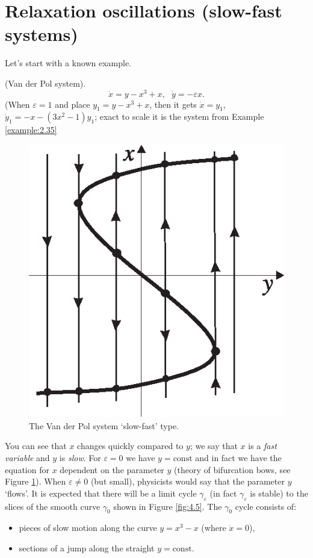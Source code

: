 \section{Relaxation oscillations (slow-fast systems)}
Let's start with a known example.
\begin{example}(Van der Pol system).
	$$
	\dot{x}=y-x^{3}+x,\text{ \ \ }\dot{y}=-\varepsilon x.
	$$
	(When $\varepsilon =1$ and place $y_{1}=y-x^{3}+x$, then it gets $\dot{x}=y_{1}$, $\dot{y}_{1}=-x-(3x^{2}-1)y_{1}$; exact to scale it is the system from Example \ref{example:2.35}
	\begin{figure}[!ht]
		\centering
		\includegraphics [scale=1.4]{jtr44}
		\caption{The Van der Pol system	`slow-fast' type.}
		\label{fig:4.4}
	\end{figure}
	
	You can see that $x$ changes quickly compared to $y$; we say that $x$ is a \emph{fast variable} and $y$ is \emph{slow}. For $\varepsilon =0$ we have $y = \textrm{const}$ and in fact we have the equation for $x$ dependent on the parameter $y$	(theory of bifurcation bows, see Figure \ref{fig:4.4}). When $\varepsilon \not=0$ (but small), physicists would say that the parameter $y$ `flows'. It is expected that there will be a limit cycle $\gamma _{\varepsilon }$ (in fact $\gamma _{\varepsilon }$ is stable) to the slices of the smooth curve $\gamma_0$ shown in Figure \ref{fig:4.5}. The $\gamma _0$ cycle consists of:
	\begin{itemize}
		\item pieces of slow motion along the curve $y=x^{3}-x$ (where $\dot{x}=0$),
		\item sections of a jump along the straight $y = \textrm{const}$.
	\end{itemize}


\end{example}

